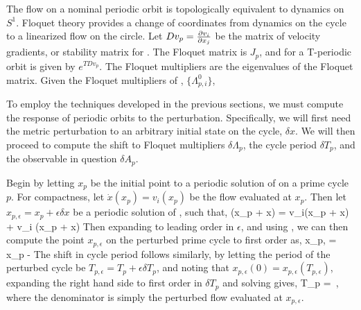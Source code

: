 \documentclass[aps,pre,
                showpacs,
                twocolumn,
                groupedaddress,
                superscriptaddress,
                floatfix]{revtex4-1}
\begin{document}
\par The flow on a nominal periodic orbit is topologically equivalent to dynamics on $S^{1}$. Floquet theory provides a change of coordinates from dynamics on the cycle to a linearized flow on the circle. Let $Dv_{p} = \frac{\partial v_{i}}{\partial x_{j}}$ be the matrix of velocity gradients, or stability matrix for . The Floquet matrix is $J_{p}$, and for a T-periodic orbit is given by $e^{T Dv_{p}}$. The Floquet multipliers are the eigenvalues of the Floquet matrix. Given the Floquet multipliers of , ${\lbrace \Lambda_{p,i}^{0} \rbrace}$,

\par To employ the techniques developed in the previous sections, we must compute the response of periodic orbits to the perturbation. Specifically, we will first need the metric perturbation to an arbitrary initial state on the cycle, $\delta x$. We will then proceed to compute the shift to Floquet multipliers $\delta \Lambda_{p}$, the cycle period $\delta T_{p}$, and the observable in question $\delta A_{p}$. 

\par Begin by letting $x_{p}$ be the initial point to a periodic solution of  on a prime cycle $p$. For compactness, let $\dot{x}(x_{p})=v_{i}(x_{p})$ be the flow evaluated at $x_{p}$. Then let $x_{p, \epsilon} = x_{p} + \epsilon \delta x$ be a periodic solution of , such that,
\beq
{}(x_{p} + \epsilon \delta x) = v_{i}(x_{p} + \epsilon \delta x) + \epsilon \delta v_{i} (x_{p} + \epsilon \delta x)
\eeq
Then expanding to leading order in $\epsilon$, and using , we can then compute the point $x_{p, \epsilon}$ on the perturbed prime cycle to first order as,
\beq
x_{p, \epsilon} = x_{p} -\epsilon {}
\eeq
The shift in cycle period follows similarly, by letting the period of the perturbed cycle be $T_{p, \epsilon} = T_{p} + \epsilon \delta T_{p}$, and noting that $x_{p, \epsilon}(0) = x_{p, \epsilon}(T_{p, \epsilon})$, expanding the right hand side to first order in $\delta T_{p}$ and solving gives,
\beq
\delta T_{p} = 
\,,
\eeq
where the denominator is simply the perturbed flow  evaluated at $x_{p, \epsilon}$. 
\end{document}
